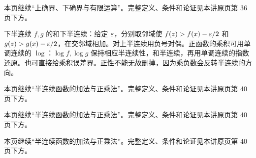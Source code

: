 本页继续“上确界、下确界与有限运算”。完整定义、条件和论证见本讲原页第 36 页下方。

下半连续 $f,g$ 的和下半连续：给定 $\varepsilon$，分别取邻域使 $f(z)>f(x)-\varepsilon/2$ 和 $g(z)>g(x)-\varepsilon/2$，在交邻域相加。对上半连续用负号对偶。正函数的乘积可用单调连续的 $\log$：$\log f,\log g$ 保持相应半连续性，和半连续，再用单调连续的指数还原。也可直接给乘积误差界。正性不能无故删掉，因为乘负数会反转半连续的方向。

本页继续“半连续函数的加法与正乘法”。完整定义、条件和论证见本讲原页第 40 页下方。

本页继续“半连续函数的加法与正乘法”。完整定义、条件和论证见本讲原页第 40 页下方。

本页继续“半连续函数的加法与正乘法”。完整定义、条件和论证见本讲原页第 40 页下方。
